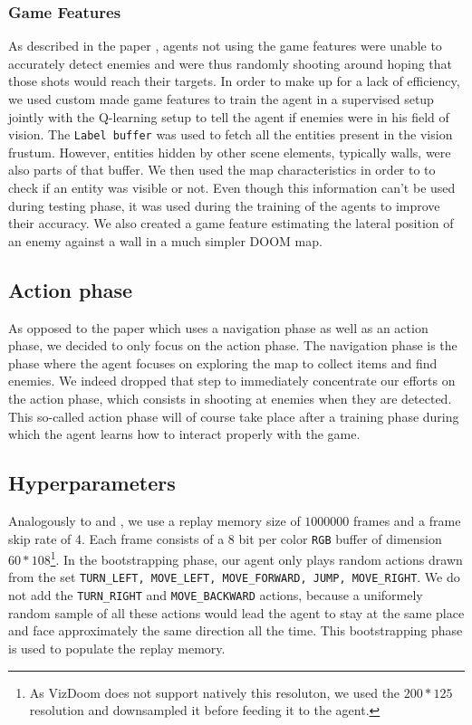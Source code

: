 \documentclass[letterpaper]{article}
\begin{document}
\subsubsection{Game Features}
As described in the paper \citep{Lample2016}, agents not using the game
features were unable to accurately detect enemies and were thus randomly
shooting around hoping that those shots would reach their targets. In order
to make up for a lack of efficiency, we used custom made game features to train the
agent in a supervised setup jointly with the Q-learning setup to tell the 
agent if enemies were in his field of
vision. The \texttt{Label buffer}  
was used to fetch all the entities present
in the vision frustum. However, entities hidden by other scene elements,
typically walls, were also parts of that buffer. We then used the map
characteristics in order to to check if an entity was visible or not. Even
though this information can't be used during testing phase, it was used
during the training of the agents to improve their accuracy.
We also created a game feature estimating the lateral position of an enemy
against a wall in a much simpler DOOM map.


\subsection{Action phase}
As opposed to the paper \citep{Lample2016} which uses a navigation phase as
well as an action phase, we decided to only focus on the action phase. The
navigation phase is the phase where the agent focuses on exploring the map to
collect items and find enemies. We indeed dropped that step to immediately
concentrate our efforts on the action phase, which consists in shooting at
enemies when they are detected. This so-called action phase will of course
take place after a training phase during which the agent learns how to interact
properly with the game.


\subsection{Hyperparameters}
Analogously to \cite{Mnih2015} and \cite{Lample2016}, we use a replay memory
size of $1000000$ frames and a frame skip rate of 4.
Each frame consists of a 8 bit per color \texttt{RGB} buffer of dimension
$60 * 108$\footnote{As VizDoom does not support natively this resoluton, we
used the $200 * 125$ resolution and downsampled it before feeding it to the
agent.}.
In the bootstrapping phase, our agent only plays random actions drawn from the
set \texttt{TURN\_LEFT, MOVE\_LEFT, MOVE\_FORWARD, JUMP, MOVE\_RIGHT}. We do
not add the \texttt{TURN\_RIGHT} and \texttt{MOVE\_BACKWARD} actions, because
a uniformely random sample of all these actions would lead the agent to stay
at the same place and face approximately the same direction all the time. This
bootstrapping phase is used to populate the replay memory.
\end{document}
